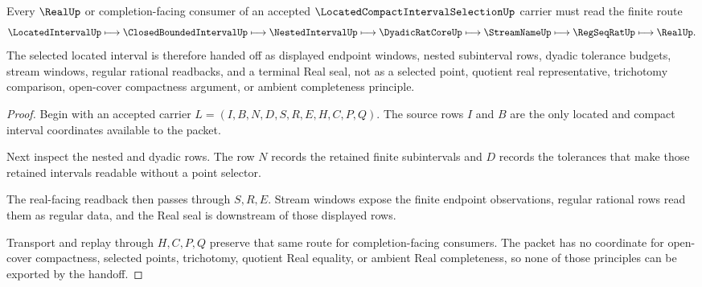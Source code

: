 \begin{theorem}
\label{thm:located-compact-interval-selection-real-handoff}
Every $\RealUp$ or completion-facing consumer of an accepted $\LocatedCompactIntervalSelectionUp$ carrier must read the finite route
$$
\LocatedIntervalUp \longmapsto \ClosedBoundedIntervalUp \longmapsto \NestedIntervalUp \longmapsto \DyadicRatCoreUp \longmapsto \StreamNameUp \longmapsto \RegSeqRatUp \longmapsto \RealUp .
$$
The selected located interval is therefore handed off as displayed endpoint windows, nested subinterval rows, dyadic tolerance budgets, stream windows, regular rational readbacks, and a terminal Real seal, not as a selected point, quotient real representative, trichotomy comparison, open-cover compactness argument, or ambient completeness principle.
\end{theorem}
\begin{proof}
Begin with an accepted carrier $L=(I,B,N,D,S,R,E,H,C,P,Q)$. The source rows $I$ and $B$ are the only located and compact interval coordinates available to the packet.

Next inspect the nested and dyadic rows. The row $N$ records the retained finite subintervals and $D$ records the tolerances that make those retained intervals readable without a point selector.

The real-facing readback then passes through $S,R,E$. Stream windows expose the finite endpoint observations, regular rational rows read them as regular data, and the Real seal is downstream of those displayed rows.

Transport and replay through $H,C,P,Q$ preserve that same route for completion-facing consumers. The packet has no coordinate for open-cover compactness, selected points, trichotomy, quotient Real equality, or ambient Real completeness, so none of those principles can be exported by the handoff.
\end{proof}



